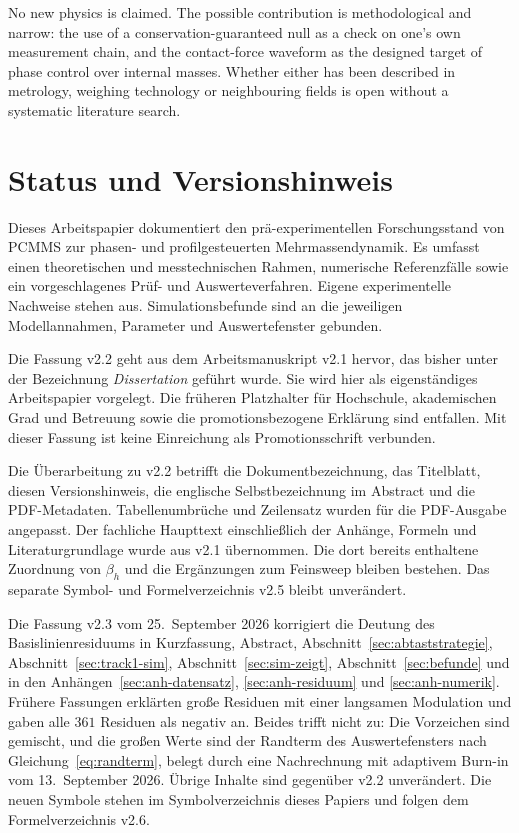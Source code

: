\documentclass[12pt,a4paper]{report}
\begin{document}
No new physics is claimed. The possible contribution is methodological
and narrow: the use of a conservation-guaranteed null as a check on one's
own measurement chain, and the contact-force waveform as the designed
target of phase control over internal masses. Whether either has been
described in metrology, weighing technology or neighbouring fields is
open without a systematic literature search.

\clearpage


\chapter*{Status und Versionshinweis}

Dieses Arbeitspapier dokumentiert den prä-experimentellen Forschungsstand
von PCMMS zur phasen- und profilgesteuerten Mehrmassendynamik. Es umfasst
einen theoretischen und messtechnischen Rahmen, numerische Referenzfälle
sowie ein vorgeschlagenes Prüf- und Auswerteverfahren. Eigene
experimentelle Nachweise stehen aus. Simulationsbefunde sind an die
jeweiligen Modellannahmen, Parameter und Auswertefenster gebunden.

Die Fassung v2.2 geht aus dem Arbeitsmanuskript v2.1 hervor, das bisher
unter der Bezeichnung \emph{Dissertation} geführt wurde. Sie wird hier
als eigenständiges Arbeitspapier vorgelegt. Die früheren Platzhalter für
Hochschule, akademischen Grad und Betreuung sowie die promotionsbezogene
Erklärung sind entfallen. Mit dieser Fassung ist keine Einreichung als
Promotionsschrift verbunden.

Die Überarbeitung zu v2.2 betrifft die Dokumentbezeichnung, das Titelblatt,
diesen Versionshinweis, die englische Selbstbezeichnung im Abstract und
die PDF-Metadaten. Tabellenumbrüche und Zeilensatz wurden für die
PDF-Ausgabe angepasst. Der fachliche Haupttext einschließlich der Anhänge,
Formeln und Literaturgrundlage wurde aus v2.1 übernommen. Die dort
bereits enthaltene Zuordnung von $\beta_h$ und die Ergänzungen zum
Feinsweep bleiben bestehen. Das separate Symbol- und Formelverzeichnis
v2.5 bleibt unverändert.

Die Fassung v2.3 vom 25.~September 2026 korrigiert die Deutung des
Basislinienresiduums in Kurzfassung, Abstract,
Abschnitt~\ref{sec:abtaststrategie}, Abschnitt~\ref{sec:track1-sim},
Abschnitt~\ref{sec:sim-zeigt}, Abschnitt~\ref{sec:befunde} und in den
Anhängen~\ref{sec:anh-datensatz}, \ref{sec:anh-residuum} und
\ref{sec:anh-numerik}. Frühere Fassungen erklärten große Residuen mit
einer langsamen Modulation und gaben alle $361$ Residuen als negativ an.
Beides trifft nicht zu: Die Vorzeichen sind gemischt, und die großen
Werte sind der Randterm des Auswertefensters nach
Gleichung~\eqref{eq:randterm}, belegt durch eine Nachrechnung mit
adaptivem Burn-in vom 13.~September 2026. Übrige Inhalte sind gegenüber
v2.2 unverändert. Die neuen Symbole stehen im Symbolverzeichnis dieses Papiers und folgen
dem Formelverzeichnis v2.6.
\end{document}
